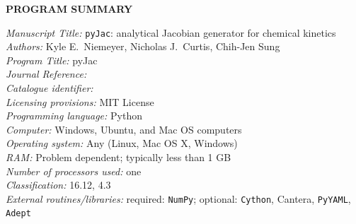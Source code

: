 \documentclass[preprint,12pt]{elsarticle}
\newcounter{bla}
\begin{document}




{\bf PROGRAM SUMMARY}

\begin{small}
\noindent
{\em Manuscript Title:} \texttt{pyJac}: analytical Jacobian generator for chemical kinetics \\
{\em Authors:} Kyle E.\ Niemeyer, Nicholas J.\ Curtis, Chih-Jen Sung \\
{\em Program Title:} pyJac \\
{\em Journal Reference:}                                      \\
{\em Catalogue identifier:}                                   \\
{\em Licensing provisions:} MIT License \\
{\em Programming language:} Python \\
{\em Computer:} Windows, Ubuntu, and Mac OS computers \\
{\em Operating system:} Any (Linux, Mac OS X, Windows) \\
{\em RAM:} Problem dependent; typically less than 1 GB \\
{\em Number of processors used:} one \\
{\em Classification:} 16.12, 4.3                                \\
{\em External routines/libraries:} required: \texttt{NumPy}; optional: \texttt{Cython}, Cantera, \texttt{PyYAML}, \texttt{Adept} \\

\end{small}
\end{document}
